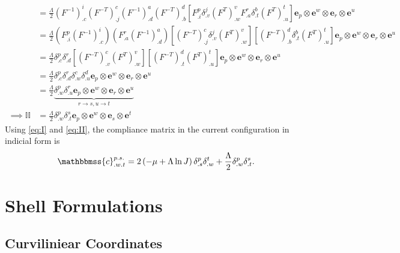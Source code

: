 \documentclass[../main.tex]{subfiles}
\begin{document}
\begin{appendices}
\begin{equation}
\begin{split}
    &= \frac{\Lambda}{2} \left(F^{-1}\right)^i_{.c} \left(F^{-T}\right)^c_{.j} \left(F^{-1}\right)^a_{.d} \left(F^{-T}\right)^d_{.b} \left[F^p_{.i} \delta^j_{.v} (F^T)^v_{.w} F^r_{.a} \delta^b_{.t} (F^T)^t_{.u} \right]\boldsymbol{e}_p \otimes \boldsymbol{e}^w \otimes \boldsymbol{e}_r \otimes \boldsymbol{e}^u\\
    &= \frac{\Lambda}{2}(F^p_{.i} (F^{-1})^i_{.c})(F^r_{.a}(F^{-1})^a_{.d})\left[\left(F^{-T}\right)^c_{.j} \delta^j_{.v} (F^T)^v_{.w}\right] \left[\left(F^{-T}\right)^d_{.b} \delta^b_{.t} (F^T)^t_{.u}\right]\boldsymbol{e}_p \otimes \boldsymbol{e}^w \otimes \boldsymbol{e}_r \otimes \boldsymbol{e}^u\\
    &= \frac{\Lambda}{2} \delta^p_{.c} \delta^r_{.d} \left[(F^{-T})^c_{.v}(F^T)^v_{.w}\right] \left[(F^{-T})^d_{.t}(F^T)^t_{.u}\right]\boldsymbol{e}_p \otimes \boldsymbol{e}^w \otimes \boldsymbol{e}_r \otimes \boldsymbol{e}^u\\
    &= \frac{\Lambda}{2} \delta^p_{.c} \delta^r_{.d} \delta^c_{.w} \delta^d_{.u} \boldsymbol{e}_p \otimes \boldsymbol{e}^w \otimes \boldsymbol{e}_r \otimes \boldsymbol{e}^u\\
    &= \frac{\Lambda}{2} \underbrace{\delta^p_{.w} \delta^r_{.u} \boldsymbol{e}_p \otimes \boldsymbol{e}^w \otimes \boldsymbol{e}_r \otimes \boldsymbol{e}^u}_{r \rightarrow s, u \rightarrow t}\\
\implies \mathbb{II} &= \frac{\Lambda}{2} \delta^p_{.w} \delta^s_{.t} \boldsymbol{e}_p \otimes \boldsymbol{e}^w \otimes \boldsymbol{e}_s \otimes \boldsymbol{e}^t
\end{split}
\end{equation}
Using \eqref{eq:I} and \eqref{eq:II}, the compliance matrix in the current configuration in indicial form is
\begin{equation}
    \mathbbmss{c}^{p.s.}_{.w.t} = 2\left(-\mu + \Lambda\ln{J}\right) \delta^p_{.s} \delta^t_{.w} + \frac{\Lambda}{2} \delta^p_{.w} \delta^s_{.t}.
\end{equation}



    \section{Shell Formulations}
    \subsection{Curviliniear Coordinates}

\end{appendices}
\end{document}
